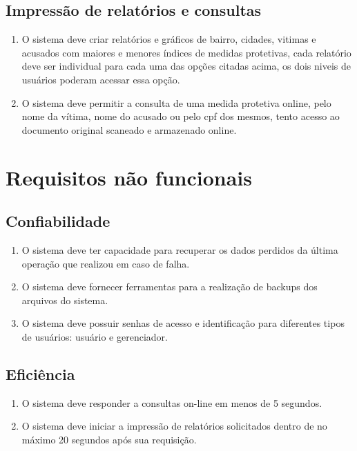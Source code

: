 \documentclass[
	12pt,				%
    oneside,			%
	a4paper,			%
	english,			%
	french,				%
	spanish,			%
	brazil,				%
	]{abntex2}
\begin{document}
		\subsection{Impressão de relatórios e consultas}\label{RF3}
			\begin{enumerate}
				\item O sistema deve criar relatórios e gráficos de bairro, cidades, vitimas e acusados com maiores e menores índices de medidas protetivas, cada relatório deve ser individual para cada uma das opções citadas acima, os dois niveis de usuários poderam acessar essa opção.
				\item O sistema deve permitir a consulta de uma medida protetiva online, pelo nome da vítima, nome do acusado ou pelo cpf dos mesmos, tento acesso ao documento original scaneado e armazenado online.
			\end{enumerate}
	

	\section{Requisitos não funcionais}
	
		\subsection{Confiabilidade} \label{sec:RFN01}
			\begin{enumerate}
				\item O sistema deve ter capacidade para recuperar os dados perdidos da última operação que realizou em caso de falha.
				\item O sistema deve fornecer ferramentas para a realização de backups dos arquivos do sistema.
				\item O sistema deve possuir senhas de acesso e identificação para diferentes tipos de usuários: usuário e gerenciador.
			\end{enumerate}

	
		\subsection{Eficiência}\label{sec:RFN02}
			\begin{enumerate}
				\item O sistema deve responder a consultas on-line em menos de 5 segundos.
				\item O sistema deve iniciar a impressão de relatórios solicitados dentro de no máximo 20 segundos após sua requisição.
			\end{enumerate}
\end{document}
